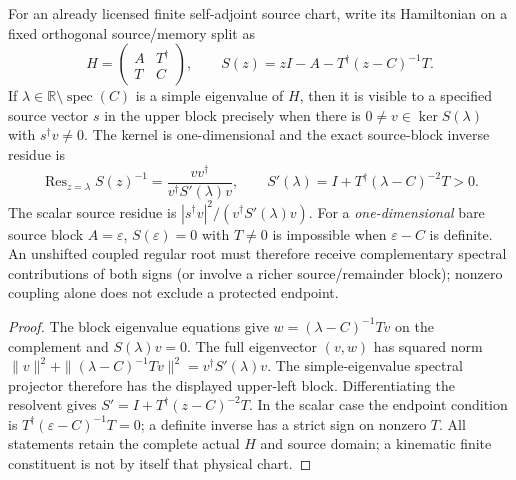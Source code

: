 \documentclass[12pt,a4paper]{article}
\begin{document}
\begin{proposition}
\label{p4:prop:v239-visible-schur-residue}
For an already licensed finite self-adjoint source chart, write its
Hamiltonian on a fixed orthogonal source/memory split as
\[
 H=\begin{pmatrix}A&T^\dagger\\T&C\end{pmatrix},\qquad
 S(z)=zI-A-T^\dagger(z-C)^{-1}T.
\]
If $\lambda\in\mathbb R\setminus\operatorname{spec}(C)$ is a simple
eigenvalue of $H$, then it is visible to a specified source vector
$s$ in the upper block precisely when there is
$0\ne v\in\ker S(\lambda)$ with $s^\dagger v\ne0$.
The kernel is one-dimensional and the exact source-block inverse
residue is
\begin{equation}\label{p4:eq:v239-schur-positive-residue}
 \boxed{\operatorname{Res}_{z=\lambda}S(z)^{-1}
    =\frac{vv^\dagger}{v^\dagger S'(\lambda)v},\qquad
 S'(\lambda)=I+T^\dagger(\lambda-C)^{-2}T>0.}
\end{equation}
The scalar source residue is
$|s^\dagger v|^2/(v^\dagger S'(\lambda)v)$.
For a \emph{one-dimensional} bare source block $A=\varepsilon$,
$S(\varepsilon)=0$ with $T\ne0$ is impossible when
$\varepsilon-C$ is definite. An unshifted coupled regular root must
therefore receive complementary spectral contributions of both signs
(or involve a richer source/remainder block); nonzero coupling alone
does not exclude a protected endpoint.
\end{proposition}
\begin{proof}
The block eigenvalue equations give
$w=(\lambda-C)^{-1}Tv$ on the complement and
$S(\lambda)v=0$. The full eigenvector $(v,w)$ has squared norm
$\|v\|^2+\|(\lambda-C)^{-1}Tv\|^2=v^\dagger S'(\lambda)v$.
The simple-eigenvalue spectral projector therefore has the displayed
upper-left block. Differentiating the resolvent gives
$S'=I+T^\dagger(z-C)^{-2}T$. In the scalar case the endpoint
condition is $T^\dagger(\varepsilon-C)^{-1}T=0$; a definite inverse
has a strict sign on nonzero $T$. All statements retain the complete
actual $H$ and source domain; a kinematic finite constituent is not by
itself that physical chart.
\end{proof}
\end{document}
